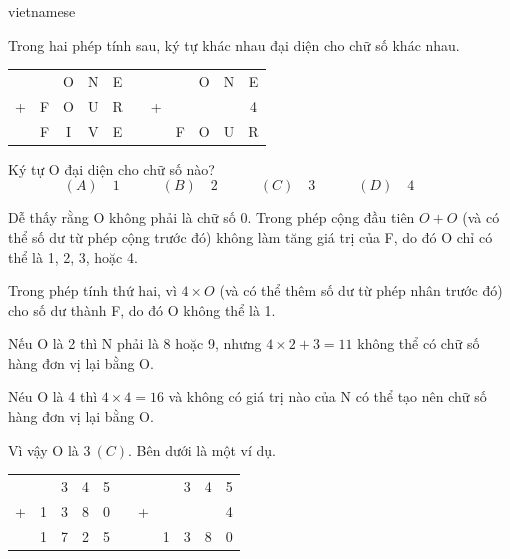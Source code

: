 \documentclass{article}
\begin{document}
\begin{otherlanguage*}{vietnamese}
\bigbreak

\begin{problem*}[PI-2024-C-P10]
    \label{problem:pi-2024-c-p10}

    Trong hai phép tính sau, ký tự khác nhau đại diện cho chữ số khác nhau.

    \begin{center}
        \begin{tabular}{ccccccccccc}
          &   & O & N & E &  &   &   & O & N & E \\
        + & F & O & U & R &  & + &   &   &   & 4 \\ \cline{1-5} \cline{7-11} 
          & F & I & V & E &  &   & F & O & U & R
        \end{tabular}
    \end{center}

    Ký tự O đại diện cho chữ số nào?
    \[
        (A) \quad 1 \qquad \quad
        (B) \quad 2 \qquad \quad
        (C) \quad 3 \qquad \quad
        (D) \quad 4 \qquad \quad
    \]
\end{problem*}

\begin{soln}
    Dễ thấy rằng O không phải là chữ số 0. Trong phép cộng đầu tiên $O + O$ (và có thể số dư từ phép cộng trước đó) không làm tăng giá trị của F, do đó O chỉ có thể là 1, 2, 3, hoặc 4.
    
    Trong phép tính thứ hai, vì $4 \times O$ (và có thể thêm số dư từ phép nhân trước đó) cho số dư thành F, do đó O không thể là 1.
    
    Nếu O là 2 thì N phải là 8 hoặc 9, nhưng $4 \times 2 + 3 = 11$ không thể có chữ số hàng đơn vị lại bằng O.

    Néu O là 4 thì $4\times 4 = 16$ và không có giá trị nào của N có thể tạo nên chữ số hàng đơn vị lại bằng O.

    Vì vậy O là $\boxed{3\ (C).}$ Bên dưới là một ví dụ.

    \begin{center}
        \begin{tabular}{ccccccccccc}
          &   & 3 & 4 & 5 &  &   &   & 3 & 4 & 5 \\
        + & 1 & 3 & 8 & 0 &  & + &   &   &   & 4 \\ \cline{1-5} \cline{7-11} 
          & 1 & 7 & 2 & 5 &  &   & 1 & 3 & 8 & 0
        \end{tabular}
    \end{center}    
\end{soln}


\end{otherlanguage*}
\end{document}
